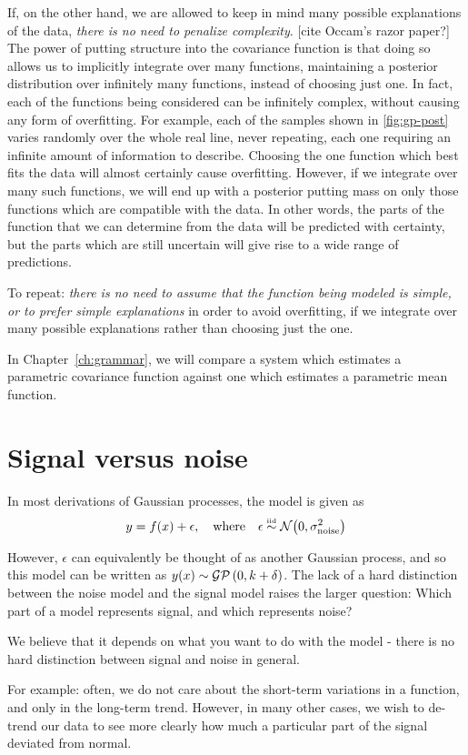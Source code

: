 If, on the other hand, we are allowed to keep in mind many possible explanations of the data, \emph{there is no need to penalize complexity}. [cite Occam's razor paper?]
The power of putting structure into the covariance function is that doing so allows us to implicitly integrate over many functions, maintaining a posterior distribution over infinitely many functions, instead of choosing just one.
In fact, each of the functions being considered can be infinitely complex, without causing any form of overfitting.
For example, each of the samples shown in \cref{fig:gp-post} varies randomly over the whole real line, never repeating, each one requiring an infinite amount of information to describe.
Choosing the one function which best fits the data will almost certainly cause overfitting.
However, if we integrate over many such functions, we will end up with a posterior putting mass on only those functions which are compatible with the data.
In other words, the parts of the function that we can determine from the data will be predicted with certainty, but the parts which are still uncertain will give rise to a wide range of predictions.

To repeat: \emph{there is no need to assume that the function being modeled is simple, or to prefer simple explanations} in order to avoid overfitting, if we integrate over many possible explanations rather than choosing just the one.

In Chapter~\ref{ch:grammar}, we will compare a system which estimates a parametric covariance function against one which estimates a parametric mean function.






\section{Signal versus noise}

In most derivations of Gaussian processes, the model is given as
%
\begin{align}
y = f(x) + \epsilon, \quad \textnormal{where} \quad \epsilon \overset{\mbox{\tiny iid}}{\sim} \mathcal{N}\!\left(0,\sigma^2_{\textnormal{noise}}\right)
\end{align}

However, $\epsilon$ can equivalently be thought of as another Gaussian process, and so this model can be written as $y(x) \sim \mathcal{GP}\left(0, k + \delta \right)$.  The lack of a hard distinction between the noise model and the signal model raises the larger question:  Which part of a model represents signal, and which represents noise?

We believe that it depends on what you want to do with the model - there is no hard distinction between signal and noise in general.

For example: often, we do not care about the short-term variations in a function, and only in the long-term trend.
However, in many other cases, we wish to de-trend our data to see more clearly how much a particular part of the signal deviated from normal.

\fi
